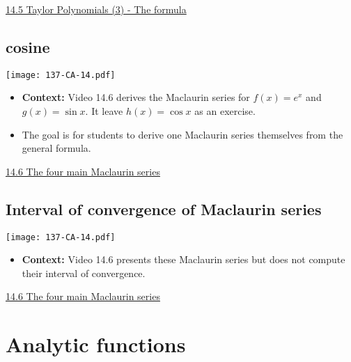 \documentclass[11pt]{article}
\newcommand{\nl}{\hfill \vspace{-1.1\baselineskip}} %
\newcommand{\vv}{\hspace{8mm}  \href{https://www.youtube.com/watch?v=c-rI1zMj0wA&list=PLlwePzQY_wW9h32ZwS6CYsY4eR_b2pE9j&index=5}{14.5 Taylor Polynomials (3) - The formula}}
\newcommand{\vvi}{\hspace{8mm}  \href{https://www.youtube.com/watch?v=o-RSENE_Yus&list=PLlwePzQY_wW9h32ZwS6CYsY4eR_b2pE9j&index=6}{14.6 The four main Maclaurin series}}
\begin{document}
\begin{videos}
\vv
\end{videos}

\newpage
\subsection{cosine}

\begin{center}
{ \texttt{[image: 137-CA-14.pdf]}} 
\end{center}

\begin{comments}
\nl
	\begin{itemize}
		\item {\bf Context:}  Video 14.6 derives the Maclaurin series for $f(x) = e^x$ and $g(x) = \sin x$.  It leave $h(x) = \cos x$ as an exercise.
		\item The goal is for students to derive one Maclaurin series themselves from the general formula.
	\end{itemize}
\end{comments}

\begin{videos}
\vvi
\end{videos}

\newpage
\subsection{Interval of convergence of Maclaurin series}

\begin{center}
{ \texttt{[image: 137-CA-14.pdf]}} 
\end{center}

\begin{comments}
\nl
	\begin{itemize}
		\item {\bf Context:}  Video 14.6 presents these Maclaurin series but does not compute their interval of convergence.
	\end{itemize}
\end{comments}

\begin{videos}
\vvi
\end{videos}

\newpage
\section{Analytic functions}
\end{document}
